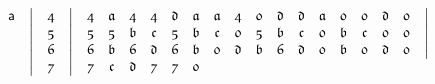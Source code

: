 \documentclass[final,12pt,a4paper,twoside,fleqn]{extbook}
\theoremstyle{definition}
\theoremstyle{remark}
\begin{document}
\begin{equation}
\begin{array}{@{}*{22}c@{}}
      \\ \nonumber
      {\textsf{a}}   &%
      \big\vert      &%
      {\mathfrak{4}} &%
      \big\vert      &%
      {\mathfrak{4}} &%
      {\mathfrak{a}} &%
      {\mathfrak{4}} &%
      {\mathfrak{4}} &%
      {\mathfrak{d}} &%
      {\mathfrak{a}} &%
      {\mathfrak{a}} &%
      {\mathfrak{4}} &%
      {\mathfrak{0}} &%
      {\mathfrak{d}} &%
      {\mathfrak{d}} &%
      {\mathfrak{a}} &%
      {\mathfrak{0}} &%
      {\mathfrak{0}} &%
      {\mathfrak{d}} &%
      {\mathfrak{0}} &%
      \big\vert       %
      \\ \nonumber
      {}             &%
      \big\vert      &%
      {\mathfrak{5}} &%
      \big\vert      &%
      {\mathfrak{5}} &%
      {\mathfrak{5}} &%
      {\mathfrak{b}} &%
      {\mathfrak{c}} &%
      {\mathfrak{5}} &%
      {\mathfrak{b}} &%
      {\mathfrak{c}} &%
      {\mathfrak{0}} &%
      {\mathfrak{5}} &%
      {\mathfrak{b}} &%
      {\mathfrak{c}} &%
      {\mathfrak{0}} &%
      {\mathfrak{b}} &%
      {\mathfrak{c}} &%
      {\mathfrak{0}} &%
      {\mathfrak{0}} &%
      \big\vert       %
      \\ \nonumber
      {}             &%
      \big\vert      &%
      {\mathfrak{6}} &%
      \big\vert      &%
      {\mathfrak{6}} &%
      {\mathfrak{b}} &%
      {\mathfrak{6}} &%
      {\mathfrak{d}} &%
      {\mathfrak{6}} &%
      {\mathfrak{b}} &%
      {\mathfrak{0}} &%
      {\mathfrak{d}} &%
      {\mathfrak{b}} &%
      {\mathfrak{6}} &%
      {\mathfrak{d}} &%
      {\mathfrak{0}} &%
      {\mathfrak{b}} &%
      {\mathfrak{0}} &%
      {\mathfrak{d}} &%
      {\mathfrak{0}} &%
      \big\vert       %
      \\ \nonumber
      {}             &%
      \big\vert      &%
      {\mathfrak{7}} &%
      \big\vert      &%
      {\mathfrak{7}} &%
      {\mathfrak{c}} &%
      {\mathfrak{d}} &%
      {\mathfrak{7}} &%
      {\mathfrak{7}} &%
      {\mathfrak{0}} &%

\end{array}
\end{equation}
\end{document}
